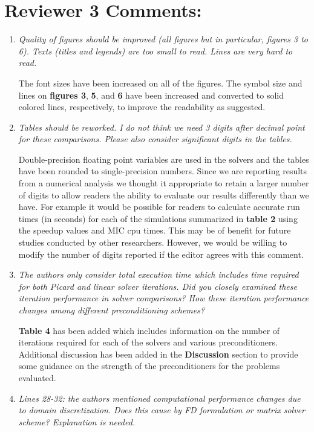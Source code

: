 \documentclass[12pt]{article} %
\begin{document}
\section*{Reviewer 3 Comments:}
\begin{enumerate}
\item \textit{Quality of figures should be improved (all figures but in particular, figures 3 to 6). Texts (titles and legends) are too small to read. Lines are very hard to read.} 

The font sizes have been increased on all of the figures. The symbol size and lines on \textbf{figures 3}, \textbf{5}, and \textbf{6} have been increased and converted to solid colored lines, respectively, to improve the readability as suggested.

\item \textit{Tables should be reworked. I do not think we need 3 digits after decimal point for these comparisons. Please also consider significant digits in the tables.} 

Double-precision floating point variables are used in the solvers and the tables have been rounded to single-precision numbers. Since we are reporting results from a numerical analysis we thought it appropriate to retain a larger number of digits to allow readers the ability to evaluate our results differently than we have. For example it would be possible for readers to calculate accurate run times (in seconds) for each of the simulations summarized in \textbf{table 2} using the speedup values and MIC cpu times. This may be of benefit for future studies conducted by other researchers. However, we would be willing to modify the number of digits reported if the editor agrees with this comment.

\item \textit{The authors only consider total execution time which includes time required for both Picard and linear solver iterations. Did you closely examined these iteration performance in solver comparisons? How these iteration performance changes among different preconditioning schemes? } 

\textbf{Table 4} has been added which includes information on the number of iterations required for each of the solvers and various preconditioners. Additional discussion has been added in the \textbf{Discussion} section to provide some guidance on the strength of the preconditioners for the problems evaluated.

\item \textit{Lines 28-32: the authors mentioned computational performance changes due to domain discretization. Does this cause by FD formulation or matrix solver scheme? Explanation is needed. } 


\end{enumerate}
\end{document}
